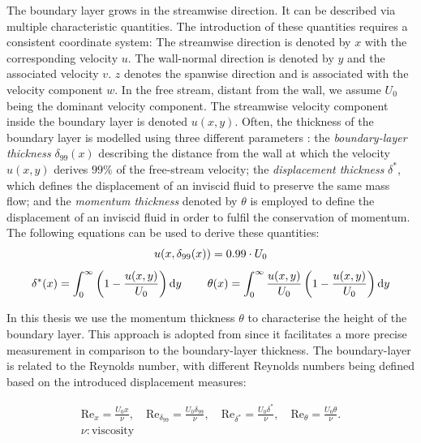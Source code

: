 The boundary layer grows in the streamwise direction. It can be described via multiple characteristic quantities. 
The introduction of these quantities requires a consistent coordinate system: 
The streamwise direction  is denoted by  $x$  with the corresponding velocity $u$. The wall-normal direction is denoted by $y$ and the associated velocity  $v$.  $z$ denotes the spanwise direction and is associated with the  velocity component $w$.
In the free stream, distant from the wall, we assume $U_0$ being the dominant velocity component. 
The streamwise velocity component inside the boundary layer is denoted  $u(x,y)$.
Often, the thickness of the boundary layer is modelled using three different parameters \citep{schlichting_boundary-layer_2017}: 
the \emph{boundary-layer thickness} $\delta_{99}(x)$ describing the distance from the wall at which the velocity $u(x,y)$ derives $99\%$ of the free-stream velocity;
the \emph{displacement thickness} $\delta^*$, which defines the displacement of an inviscid fluid to preserve the same mass flow;
and the \emph{momentum thickness} denoted by  $\theta$  is employed to define the displacement of an inviscid fluid in order to fulfil the conservation of momentum.
The following equations can be used to derive these quantities:
\begin{gather}\label{eq: tblThickness}
    u (x, \delta_{99}(x)) = 0.99 \cdot U_0 \\[1ex]
    \delta^*(x) = \int_0^\infty \left( 1 - \frac{u(x,y)}{U_0} \right) \mathrm{d}y \hspace{0.8cm}
     \theta(x) = \int_0^\infty \frac{u(x,y)}{U_0} \left( 1 - \frac{u(x,y)}{U_0} \right) \mathrm{d}y
\end{gather}


In this thesis we use the momentum thickness $\theta$ to characterise the height of the boundary layer.
This approach is adopted from \citet{schlatter_assessment_2010} since it facilitates a  more precise measurement in comparison to the boundary-layer thickness. 
The boundary-layer is related to the Reynolds number, 
with different Reynolds numbers being defined based on the introduced displacement measures:

\begin{gather}
    \mathrm{Re}_x = \frac{U_0 x}{\nu}, \quad
    \mathrm{Re}_{\delta_{99}} = \frac{U_0 \delta_{99}}{\nu}, \quad
    \mathrm{Re}_{\delta^*} = \frac{U_0 \delta^*}{\nu}, \quad
    \mathrm{Re}_\theta = \frac{U_0 \theta}{\nu}. \\
    \nu : \text{viscosity} \nonumber
\end{gather}

